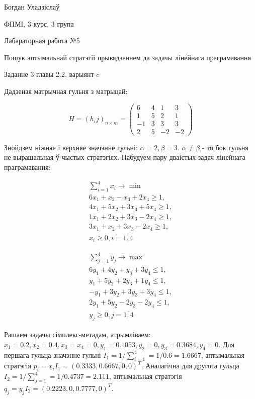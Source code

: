 \documentclass{article}
\begin{document}
{\large

Богдан Уладзіслаў

ФПМІ, 3 курс, 3 група

\vspace{5mm}

Лабараторная работа №5

Пошук аптымальнай стратэгіі прывядзеннем да задачы лінейнага праграмавання

}

\vspace{15mm}

Заданне 3 главы 2.2, варыянт $c$

Дадзеная матрычная гульня з матрыцай:

\[
H = (h_ij)_{n\times m} =
 \begin{pmatrix}
  6 & 4 & 1 & 3 \\
  1 & 5 & 2 & 1 \\
  -1 & 3 & 3 & 3 \\
  2 & 5 & -2 & -2
 \end{pmatrix}
\]

Знойдзем ніжняе і верхняе значэнне гульні: $\alpha = 2, \beta = 3$. $\alpha \neq \beta$ -
то бок гульня не вырашальная ў чыстых стратэгіях. Пабудуем пару дваістых задач
лінейнага праграмавання:

\begin{multicols}{2}

\begin{equation}
\begin{aligned}
\sum_{i=1}^{4} x_i \to \min\\
6 x_1 + x_2 - x_3 + 2 x_4 \geq 1,\\
4 x_1 + 5 x_2 + 3 x_3 + 5 x_4 \geq 1,\\
1 x_1 + 2 x_2 + 3 x_3 - 2 x_4 \geq 1,\\
3 x_1 + x_2 + 3 x_3 - 2 x_4 \geq 1,\\
x_i \geq 0, i = \overline{1, 4}
\end{aligned}
\end{equation}

\begin{equation}
\begin{aligned}
\sum_{j=1}^{4} y_j \to \max\\
6 y_1 + 4 y_2 + y_3 + 3 y_4 \leq 1,\\
y_1 + 5 y_2 + 2 y_3 + 1 y_4 \leq 1,\\
- y_1 + 3 y_2 + 3 y_3 + 3 y_4 \leq 1,\\
2 y_1 + 5 y_2 - 2 y_3 - 2 y_4 \leq 1,\\
y_j \geq 0, j = \overline{1, 4}
\end{aligned}
\end{equation}

\end{multicols}

Рашаем задачы сімплекс-метадам, атрымліваем: $x_1 = 0.2, x_2 = 0.4, x_3 = x_4 = 0, y_1 = 0.1053, y_2 = 0, y_3 = 0.3684, y_4 = 0$.
Для першага гульца значэнне гульні $I_1 = 1 / \sum_{i=1}^4 = 1 / 0.6 = 1.6667$,
аптымальная стратэгія $p_i = x_i I_1 = (0.3333, 0.6667, 0, 0)^T$.
Аналагічна для другога гульца $I_2 = 1 / \sum_{j=1}^4 = 1 / 0.4737 = 2.111$,
аптымальная стратэгія $q_j = y_j I_2 = (0.2223, 0, 0.7777, 0)^T$.
\end{document}
